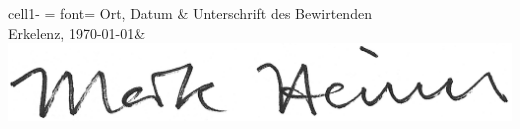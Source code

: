 \documentclass[11pt,a4paper]{scrartcl}
\begin{document}
\vspace{1cm}

\noindent
\begin{tblr}{
    cell{1}{-} = {font=\bfseries}
    }
Ort, Datum \hspace{4cm}     & Unterschrift des Bewirtenden\\
    Erkelenz, \today           & \includegraphics[scale=1,align=c]{./include/markheines.png}\\
\end{tblr}
\end{document}

